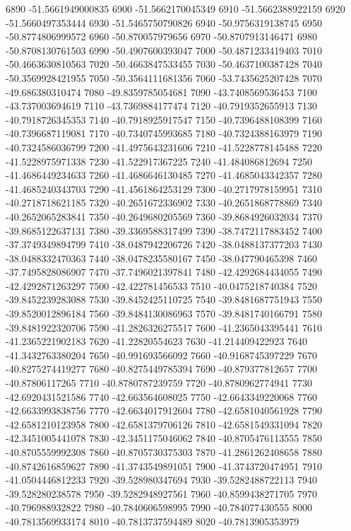 {6890 -51.5661949000835
6900 -51.5662170045349
6910 -51.5662388922159
6920 -51.5660497353444
6930 -51.5465750790826
6940 -50.9756319138745
6950 -50.8774806999572
6960 -50.870057979656
6970 -50.8707913146471
6980 -50.8708130761503
6990 -50.4907600393047
7000 -50.4871233419403
7010 -50.4663630810563
7020 -50.4663847533455
7030 -50.4637100387428
7040 -50.3569928421955
7050 -50.3564111681356
7060 -53.7435625207428
7070 -49.686380310474
7080 -49.8359785054681
7090 -43.7408569536453
7100 -43.737003694619
7110 -43.7369884177474
7120 -40.7919352655913
7130 -40.7918726345353
7140 -40.7918925917547
7150 -40.7396488108399
7160 -40.7396687119081
7170 -40.7340745993685
7180 -40.7324388163979
7190 -40.7324586036799
7200 -41.4975643231606
7210 -41.5228778145488
7220 -41.5228975971338
7230 -41.522917367225
7240 -41.484086812694
7250 -41.4686449234633
7260 -41.4686646130485
7270 -41.4685043342357
7280 -41.4685240343703
7290 -41.4561864253129
7300 -40.2717978159951
7310 -40.2718718621185
7320 -40.2651672336902
7330 -40.2651868778869
7340 -40.2652065283841
7350 -40.2649680205569
7360 -39.8684926032034
7370 -39.8685122637131
7380 -39.3369588317499
7390 -38.7472117883452
7400 -37.3749349894799
7410 -38.0487942206726
7420 -38.0488137377203
7430 -38.0488332470363
7440 -38.0478235580167
7450 -38.047790465398
7460 -37.7495828086907
7470 -37.7496021397841
7480 -42.4292684434055
7490 -42.4292871263297
7500 -42.422781456533
7510 -40.0475218740384
7520 -39.8452239283088
7530 -39.8452425110725
7540 -39.8481687751943
7550 -39.8520012896184
7560 -39.8484130086963
7570 -39.8481740166791
7580 -39.8481922320706
7590 -41.2826326275517
7600 -41.2365043395441
7610 -41.2365221902183
7620 -41.22820554623
7630 -41.214409422923
7640 -41.3432763380204
7650 -40.991693566092
7660 -40.9168745397229
7670 -40.8275274419277
7680 -40.8275449785394
7690 -40.879377812657
7700 -40.87806117265
7710 -40.8780787239759
7720 -40.8780962774941
7730 -42.6920431521586
7740 -42.663564608025
7750 -42.6643349220068
7760 -42.6633993838756
7770 -42.6634017912604
7780 -42.6581040561928
7790 -42.6581210123958
7800 -42.6581379706126
7810 -42.6581549331094
7820 -42.3451005441078
7830 -42.3451175046062
7840 -40.8705476113555
7850 -40.8705559992308
7860 -40.8705730375303
7870 -41.2861262408658
7880 -40.8742616859627
7890 -41.3743549891051
7900 -41.3743720474951
7910 -41.0504446812233
7920 -39.528980347694
7930 -39.5282488722113
7940 -39.528280238578
7950 -39.5282948927561
7960 -40.8599438271705
7970 -40.796988932822
7980 -40.7840606598995
7990 -40.784077430555
8000 -40.7813569933174
8010 -40.7813737594489
8020 -40.7813905353979
}
